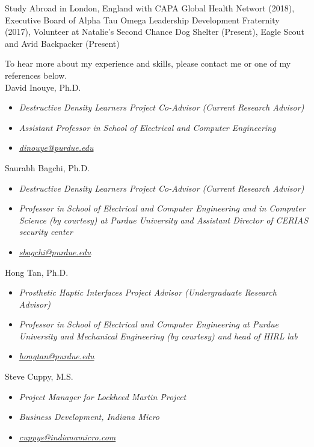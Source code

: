 \documentclass[10pt]{article}
\begin{document}
\vspace{\cvbetweensectionandheadingextraskipamount}

    {Study Abroad in London, England with CAPA Global Health Networt (2018), Executive Board of Alpha Tau Omega Leadership Development Fraternity (2017), Volunteer at Natalie's Second Chance Dog Shelter (Present), Eagle Scout and Avid Backpacker (Present)}

\vspace{\cvbetweensectionandheadingextraskipamount}
\cvitem{
    \cvdurationstyle{}}
    {
    To hear more about my experience and skills, please contact me or one of my references below.
    \vspace{\cvbetweensectionandheadingextraskipamount}
    \\
    David Inouye, Ph.D.
    \begin{itemize}
        \item \textit{Destructive Density Learners Project Co-Advisor (Current Research Advisor)}
        \item \textit{Assistant Professor in School of Electrical and Computer Engineering}
        \item\href{mailto:dinouye@purdue.edu}{\textit{dinouye@purdue.edu}}
        \end{itemize}
    Saurabh Bagchi, Ph.D.
    \begin{itemize}
        \item \textit{Destructive Density Learners Project Co-Advisor (Current Research Advisor)}
        \item \textit{Professor in School of Electrical and Computer Engineering and in Computer Science (by courtesy) at Purdue University and Assistant Director of CERIAS security center}
        \item\href{mailto:sbagchi@purdue.edu}{\textit{sbagchi@purdue.edu}}
        \end{itemize}
    Hong Tan, Ph.D.
        \begin{itemize}
        \item \textit{Prosthetic Haptic Interfaces Project Advisor (Undergraduate Research Advisor)}
        \item \textit{Professor in School of Electrical and Computer Engineering at Purdue University and Mechanical Engineering (by courtesy) and head of HIRL lab}
        \item\href{mailto:hongtan@purdue.edu}{\textit{hongtan@purdue.edu}}
        \end{itemize}
    Steve Cuppy, M.S.
        \begin{itemize}
        \item \textit{Project Manager for Lockheed Martin Project}
        \item \textit{Business Development, Indiana Micro}
        \item\href{mailto:cuppys@indianamicro.com}{\textit{cuppys@indianamicro.com}}
        \end{itemize}
    }


\end{document}
